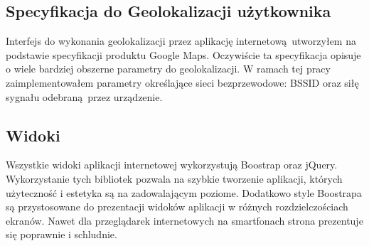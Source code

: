 
\subsection{Specyfikacja do Geolokalizacji użytkownika}
Interfejs do wykonania geolokalizacji przez aplikację internetową utworzyłem na podstawie specyfikacji produktu Google Maps.\cite{GoogleMapsGeolocationAPI} Oczywiście ta specyfikacja opisuje o wiele bardziej obszerne parametry do geolokalizacji. W ramach tej pracy zaimplementowałem parametry określające sieci bezprzewodowe: BSSID oraz siłę sygnału odebraną przez urządzenie.

\subsection{Widoki}
Wszystkie widoki aplikacji internetowej wykorzystują Boostrap oraz jQuery. Wykorzystanie tych bibliotek pozwala na szybkie tworzenie aplikacji, których użyteczność i estetyka są na zadowalającym poziome. Dodatkowo style Boostrapa są przystosowane do prezentacji widoków aplikacji w różnych rozdzielczościach ekranów. Nawet dla przeglądarek internetowych na smartfonach strona prezentuje się poprawnie i schludnie.
